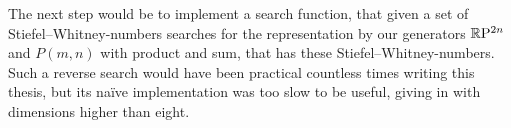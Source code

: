 The next step would be to implement a search function, that given a set of Stiefel--Whitney-numbers searches for the representation by our generators $\mathbb{R}\mathrm{P}^{2n}$ and $P(m,n)$ with product and sum, that has these Stiefel--Whitney-numbers.
Such a reverse search would have been practical countless times writing this thesis, but its na\"ive implementation was too slow to be useful, giving in with dimensions higher than eight.
